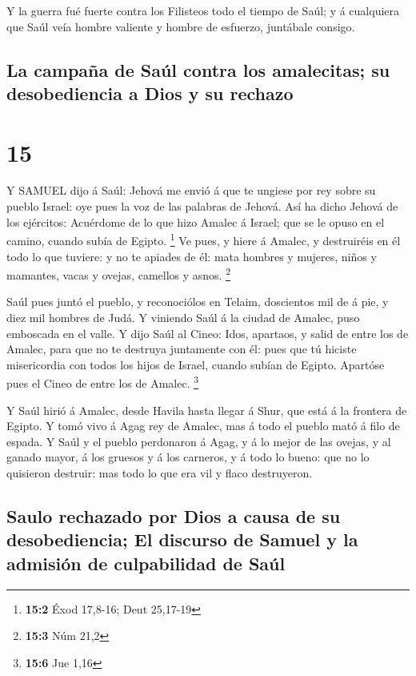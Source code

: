  Y la guerra fué fuerte contra los Filisteos todo el tiempo
de Saúl; y á cualquiera que Saúl veía hombre valiente y hombre de
esfuerzo, juntábale consigo.

\hypertarget{la-campauxf1a-de-sauxfal-contra-los-amalecitas-su-desobediencia-a-dios-y-su-rechazo}{%
\subsection{La campaña de Saúl contra los amalecitas; su desobediencia a
Dios y su
rechazo}\label{la-campauxf1a-de-sauxfal-contra-los-amalecitas-su-desobediencia-a-dios-y-su-rechazo}}

\hypertarget{section-14}{%
\section{15}\label{section-14}}

 Y SAMUEL dijo á Saúl: Jehová me envió á que te ungiese por
rey sobre su pueblo Israel: oye pues la voz de las palabras de Jehová.
 Así ha dicho Jehová de los ejércitos: Acuérdome de lo que
hizo Amalec á Israel; que se le opuso en el camino, cuando subía de
Egipto. \footnote{\textbf{15:2} Éxod 17,8-16; Deut 25,17-19}
 Ve pues, y hiere á Amalec, y destruiréis en él todo lo que
tuviere: y no te apiades de él: mata hombres y mujeres, niños y
mamantes, vacas y ovejas, camellos y asnos. \footnote{\textbf{15:3} Núm
  21,2}

 Saúl pues juntó el pueblo, y reconociólos en Telaim,
doscientos mil de á pie, y diez mil hombres de Judá.  Y
viniendo Saúl á la ciudad de Amalec, puso emboscada en el valle.
 Y dijo Saúl al Cineo: Idos, apartaos, y salid de entre los
de Amalec, para que no te destruya juntamente con él: pues que tú
hiciste misericordia con todos los hijos de Israel, cuando subían de
Egipto. Apartóse pues el Cineo de entre los de Amalec. \footnote{\textbf{15:6}
  Jue 1,16}

 Y Saúl hirió á Amalec, desde Havila hasta llegar á Shur,
que está á la frontera de Egipto.  Y tomó vivo á Agag rey de
Amalec, mas á todo el pueblo mató á filo de espada.  Y Saúl
y el pueblo perdonaron á Agag, y á lo mejor de las ovejas, y al ganado
mayor, á los gruesos y á los carneros, y á todo lo bueno: que no lo
quisieron destruir: mas todo lo que era vil y flaco destruyeron.

\hypertarget{saulo-rechazado-por-dios-a-causa-de-su-desobediencia-el-discurso-de-samuel-y-la-admisiuxf3n-de-culpabilidad-de-sauxfal}{%
\subsection{Saulo rechazado por Dios a causa de su desobediencia; El
discurso de Samuel y la admisión de culpabilidad de
Saúl}\label{saulo-rechazado-por-dios-a-causa-de-su-desobediencia-el-discurso-de-samuel-y-la-admisiuxf3n-de-culpabilidad-de-sauxfal}}

